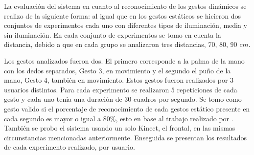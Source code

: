 La evaluación del sistema en cuanto al reconocimiento de los gestos dinámicos se realizo de la siguiente forma: al igual que en los gestos estáticos se hicieron dos conjuntos de experimentos cada uno con diferentes tipos de iluminación, media y sin iluminación. En cada conjunto de experimentos se tomo en cuenta la distancia, debido a que en cada grupo se analizaron tres distancias, $70$, $80$, $90$ $cm$. 

Los gestos analizados fueron dos. El primero corresponde a la palma de la mano con los dedos separados, Gesto 3, en movimiento y el segundo el puño de la mano, Gesto 4, también en movimiento. Estos gestos fueron realizados por $3$ usuarios distintos. Para cada experimento se realizaron $5$ repeticiones de cada gesto y cada uno tenia una duración de $30$ cuadros por segundo. Se tomo como gesto valido si el porcentaje de reconocimiento de cada gestos estático presente en cada segundo es mayor o igual a $80 \%$, esto en base al trabajo realizado por \citep{Sultana2012}. \\
También se probo el sistema usando un solo Kinect, el frontal, en las mismas circunstancias mencionadas anteriormente. 
Enseguida se presentan los resultados de cada experimento realizado, por usuario. 

